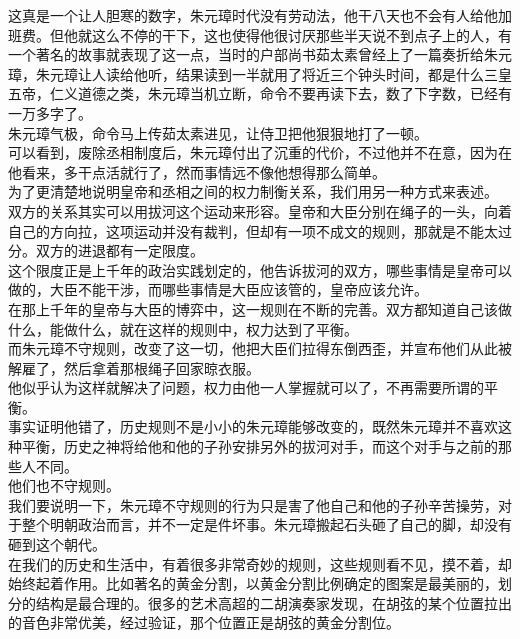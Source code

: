 \begin{multicols}{\theparacolNo}
这真是一个让人胆寒的数字，朱元璋时代没有劳动法，他干八天也不会有人给他加班费。但他就这么不停的干下，这也使得他很讨厌那些半天说不到点子上的人，有一个著名的故事就表现了这一点，当时的户部尚书茹太素曾经上了一篇奏折给朱元璋，朱元璋让人读给他听，结果读到一半就用了将近三个钟头时间，都是什么三皇五帝，仁义道德之类，朱元璋当机立断，命令不要再读下去，数了下字数，已经有一万多字了。\\

朱元璋气极，命令马上传茹太素进见，让侍卫把他狠狠地打了一顿。\\

可以看到，废除丞相制度后，朱元璋付出了沉重的代价，不过他并不在意，因为在他看来，多干点活就行了，然而事情远不像他想得那么简单。\\

为了更清楚地说明皇帝和丞相之间的权力制衡关系，我们用另一种方式来表述。\\

双方的关系其实可以用拔河这个运动来形容。皇帝和大臣分别在绳子的一头，向着自己的方向拉，这项运动并没有裁判，但却有一项不成文的规则，那就是不能太过分。双方的进退都有一定限度。\\

这个限度正是上千年的政治实践划定的，他告诉拔河的双方，哪些事情是皇帝可以做的，大臣不能干涉，而哪些事情是大臣应该管的，皇帝应该允许。\\

在那上千年的皇帝与大臣的博弈中，这一规则在不断的完善。双方都知道自己该做什么，能做什么，就在这样的规则中，权力达到了平衡。\\

而朱元璋不守规则，改变了这一切，他把大臣们拉得东倒西歪，并宣布他们从此被解雇了，然后拿着那根绳子回家晾衣服。\\

他似乎认为这样就解决了问题，权力由他一人掌握就可以了，不再需要所谓的平衡。\\

事实证明他错了，历史规则不是小小的朱元璋能够改变的，既然朱元璋并不喜欢这种平衡，历史之神将给他和他的子孙安排另外的拔河对手，而这个对手与之前的那些人不同。\\

他们也不守规则。\\

我们要说明一下，朱元璋不守规则的行为只是害了他自己和他的子孙辛苦操劳，对于整个明朝政治而言，并不一定是件坏事。朱元璋搬起石头砸了自己的脚，却没有砸到这个朝代。\\

在我们的历史和生活中，有着很多非常奇妙的规则，这些规则看不见，摸不着，却始终起着作用。比如著名的黄金分割，以黄金分割比例确定的图案是最美丽的，划分的结构是最合理的。很多的艺术高超的二胡演奏家发现，在胡弦的某个位置拉出的音色非常优美，经过验证，那个位置正是胡弦的黄金分割位。\\


\end{multicols}
